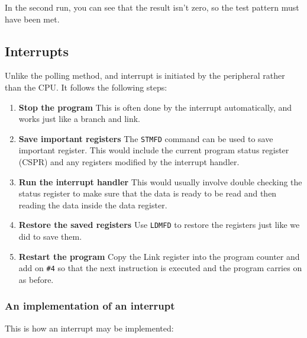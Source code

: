 In the second run, you can see that the result isn't zero, so the test pattern
must have been met.

\subsection{Interrupts}

Unlike the polling method, and interrupt is initiated by the peripheral rather
than the CPU. It follows the following steps:

\begin{enumerate}
	\item {\bf Stop the program}
			This is often done by the interrupt automatically, and works just
			like a branch and link.
	\item {\bf Save important registers}
			The {\tt STMFD} command can be used to save important register.
			This would include the current program status register (CSPR) and
			any registers modified by the interrupt handler.
	\item {\bf Run the interrupt handler}
			This would usually involve double checking the status register to
			make sure that the data is ready to be read and then reading the
			data inside the data register.
	\item {\bf Restore the saved registers}
			Use {\tt LDMFD} to restore the registers just like we did to save
			them.
	\item {\bf Restart the program}
			Copy the Link register into the program counter and add on {\tt \#4}
			so that the next instruction is executed and the program carries on
			as before.
\end{enumerate}

\subsubsection{An implementation of an interrupt}

This is how an interrupt may be implemented:


